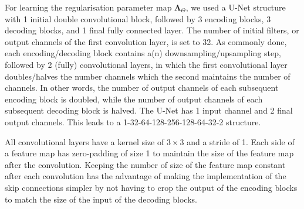 \documentclass[12pt]{article}
\begin{document}




For learning the regularisation parameter map $\mathbf{\Lambda}_{\Theta}$, we used a U-Net structure with 1 initial double convolutional block, followed by 3 encoding blocks, 3 decoding blocks, and 1 final fully connected layer.
The number of initial filters, or output channels of the first convolution layer, is set to 32.
As commonly done, each encoding/decoding block contains a(n) downsampling/upsampling step, followed by 2 (fully) convolutional layers, in which the first convolutional layer doubles/halves the number channels which the second maintains the number of channels.
In other words, the number of output channels of each subsequent encoding block is doubled, while the number of output channels of each subsequent decoding block is halved.
The U-Net has 1 input channel and 2 final output channels.
This leads to a 1-32-64-128-256-128-64-32-2 structure.

All convolutional layers have a kernel size of $3 \times 3$ and a stride of 1.
Each side of a feature map has zero-padding of size 1 to maintain the size of the feature map after the convolution.
Keeping the number of size of the feature map constant after each convolution has the advantage of making the implementation of the skip connections simpler by not having to crop the output of the encoding blocks to match the size of the input of the decoding blocks.
\end{document}

